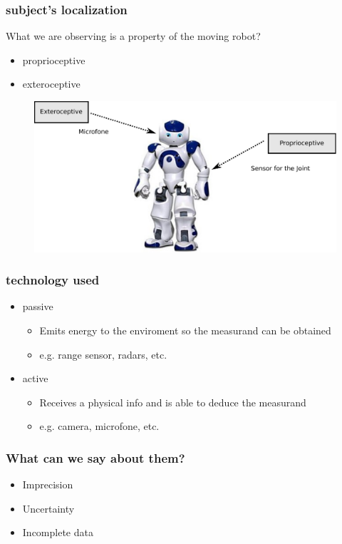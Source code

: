 \documentclass{beamer}
\begin{document}
	\begin{frame}
		\frametitle{subject's localization}
		What we are observing is a property of the moving robot?
		\begin{itemize}
		\item proprioceptive
		\item exteroceptive
		\end{itemize}
		\begin{figure}[h]
			\center
			\includegraphics[scale=0.4]{img/fig:nao:config}
		 \end{figure}		
	\end{frame}

	\begin{frame}
		\frametitle{technology used}

		\begin{itemize}
		\item passive
			\begin{itemize}
				\item Emits energy to the enviroment so the measurand can be obtained
				\item e.g. range sensor, radars, etc.
			\end{itemize}		
		\item active
			\begin{itemize}
				\item Receives a physical info and is able to deduce the measurand
				\item e.g. camera, microfone, etc. 
			\end{itemize}		
		
		\end{itemize}		
		
	\end{frame}
	
	\begin{frame}
		\frametitle{What can we say about them?}
			
		\begin{itemize}
			\item Imprecision
			\item Uncertainty
			\item Incomplete data
		\end{itemize}		
		
	\end{frame}
\end{document}
